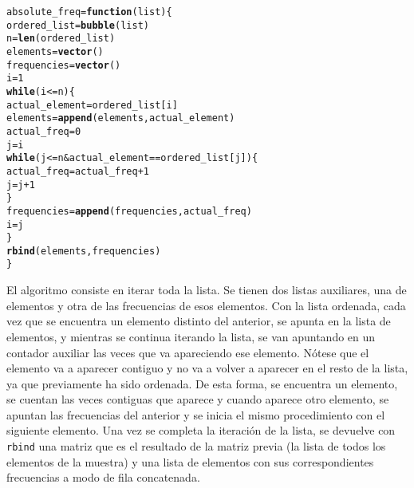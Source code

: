 \documentclass[12pt]{report}\usepackage[]{graphicx}\usepackage[dvipsnames]{xcolor}
\makeatletter
\newcommand{\hlnum}[1]{\textcolor[rgb]{0.686,0.059,0.569}{#1}}%
\newcommand{\hlopt}[1]{\textcolor[rgb]{0,0,0}{#1}}%
\newcommand{\hlstd}[1]{\textcolor[rgb]{0.345,0.345,0.345}{#1}}%
\newcommand{\hlkwa}[1]{\textcolor[rgb]{0.161,0.373,0.58}{\textbf{#1}}}%
\newcommand{\hlkwb}[1]{\textcolor[rgb]{0.69,0.353,0.396}{#1}}%
\newcommand{\hlkwc}[1]{\textcolor[rgb]{0.333,0.667,0.333}{#1}}%
\newcommand{\hlkwd}[1]{\textcolor[rgb]{0.737,0.353,0.396}{\textbf{#1}}}%
\newenvironment{kframe}{%
 \def\at@end@of@kframe{}%
 \ifinner\ifhmode%
  \def\at@end@of@kframe{\end{minipage}}%
  \begin{minipage}{\columnwidth}%
 \fi\fi%
 \def\FrameCommand##1{\hskip\@totalleftmargin \hskip-\fboxsep
 \colorbox{shadecolor}{##1}\hskip-\fboxsep
     \hskip-\linewidth \hskip-\@totalleftmargin \hskip\columnwidth}%
 \MakeFramed {\advance\hsize-\width
   \@totalleftmargin\z@ \linewidth\hsize
   \@setminipage}}%
 {\par\unskip\endMakeFramed%
 \at@end@of@kframe}
\newenvironment{knitrout}{}{} %
\makeatother
\begin{document}
\begin{knitrout}
\color{fgcolor}\begin{kframe}
\begin{alltt}
\hlstd{absolute_freq} \hlkwb{=} \hlkwa{function}\hlstd{(}\hlkwc{list}\hlstd{) \{}
        \hlstd{ordered_list} \hlkwb{=} \hlkwd{bubble}\hlstd{(list)}
        \hlstd{n} \hlkwb{=} \hlkwd{len}\hlstd{(ordered_list)}
        \hlstd{elements} \hlkwb{=} \hlkwd{vector}\hlstd{()}
        \hlstd{frequencies} \hlkwb{=} \hlkwd{vector}\hlstd{()}
        \hlstd{i} \hlkwb{=} \hlnum{1}
        \hlkwa{while} \hlstd{(i} \hlopt{<=} \hlstd{n) \{}
                \hlstd{actual_element} \hlkwb{=} \hlstd{ordered_list[i]}
                \hlstd{elements} \hlkwb{=} \hlkwd{append}\hlstd{(elements, actual_element)}
                \hlstd{actual_freq} \hlkwb{=} \hlnum{0}
                \hlstd{j} \hlkwb{=} \hlstd{i}
                \hlkwa{while}\hlstd{(j} \hlopt{<=} \hlstd{n} \hlopt{&} \hlstd{actual_element} \hlopt{==} \hlstd{ordered_list[j]) \{}
                        \hlstd{actual_freq} \hlkwb{=} \hlstd{actual_freq} \hlopt{+} \hlnum{1}
                        \hlstd{j} \hlkwb{=} \hlstd{j}\hlopt{+}\hlnum{1}
                \hlstd{\}}
                \hlstd{frequencies} \hlkwb{=} \hlkwd{append}\hlstd{(frequencies, actual_freq)}
                \hlstd{i} \hlkwb{=} \hlstd{j}
        \hlstd{\}}
        \hlkwd{rbind}\hlstd{(elements, frequencies)}
\hlstd{\}}
\end{alltt}
\end{kframe}
\end{knitrout}
			
			El algoritmo consiste en iterar toda la lista. Se tienen dos listas auxiliares, una de elementos y otra de las frecuencias de esos elementos. Con la lista ordenada, cada vez que se encuentra un elemento distinto del anterior, se apunta en la lista de elementos, y mientras se continua iterando la lista, se van apuntando en un contador auxiliar las veces que va apareciendo ese elemento. Nótese que el elemento va a aparecer contiguo y no va a volver a aparecer en el resto de la lista, ya que previamente ha sido ordenada. De esta forma, se encuentra un elemento, se cuentan las veces contiguas que aparece y cuando aparece otro elemento, se apuntan las frecuencias del anterior y se inicia el mismo procedimiento con el siguiente elemento. Una vez se completa la iteración de la lista,  se devuelve con \texttt{rbind} una matriz que es el resultado de la matriz previa (la lista de todos los elementos de la muestra) y una lista de elementos con sus correspondientes frecuencias a modo de fila concatenada.\\
			
\end{document}
